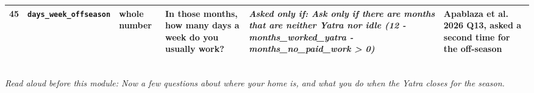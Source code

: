 \documentclass[9pt,a4paper,landscape]{article}
\begin{document}
\begin{longtable}{@{}p{0.5cm}p{3.3cm}p{1.7cm}p{7.3cm}p{5.6cm}p{5.4cm}@{}}
\footnotesize 45 & \footnotesize\texttt{days\_week\_offseason} & \scriptsize whole number & \footnotesize In those months, how many days a week do you usually work?\par\vspace{1pt}{\footnotesize\color{hdr}{\hifont उन महीनों में आप हफ़्ते में कितने दिन काम करते हैं?}} & \scriptsize \textit{Asked only if: Ask only if there are months that are neither Yatra nor idle (12 - months\_worked\_yatra - months\_no\_paid\_work > 0)} & \scriptsize Apablaza et al. 2026 Q13, asked a second time for the off-season\\
\bottomrule\end{longtable}\vspace{6pt}
\\[3pt]
{\small\itshape Read aloud before this module: Now a few questions about where your home is, and what you do when the Yatra closes for the season.}\\[5pt]
\end{document}
